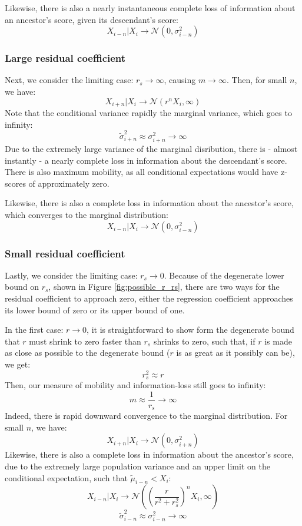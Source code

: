\documentclass[a4paper,11pt]{article} %
\begin{document}
Likewise, there is also a nearly instantaneous complete loss of information about an ancestor's score, given its descendant's score:
$$X_{i-n}|X_i \rightarrow \mathcal{N}(0, \sigma_{i-n}^2)$$


\subsubsection*{Large residual coefficient}
Next, we consider the limiting case: $r_s \rightarrow \infty$, causing $m \rightarrow \infty$. Then, for small $n$, we have:
$$X_{i+n}|X_i \rightarrow \mathcal{N}(r^nX_i, \infty)$$
Note that the conditional variance rapidly the marginal variance, which goes to infinity:
$$ \tilde{\sigma}_{i+n}^2 \approx \sigma_{i+n}^2 \rightarrow \infty$$
Due to the extremely large variance of the marginal disribution, there is - almost instantly - a nearly complete loss in information about the descendant's score. There is also maximum mobility, as all conditional expectations would have z-scores of approximately zero. 

Likewise, there is also a complete loss in information about the ancestor's score, which converges to the marginal distribution:
$$X_{i-n}|X_i \rightarrow \mathcal{N}(0, \sigma_{i-n}^2)$$


\subsubsection*{Small residual coefficient}
Lastly, we consider the limiting case: $r_s \rightarrow 0$. Because of the degenerate lower bound on $r_s$, shown in Figure \ref{fig:possible_r_rs}, there are two ways for the residual coefficient to approach zero, either the regression coefficient approaches its lower bound of zero or its upper bound of one.

In the first case: $r \rightarrow 0$, it is straightforward to show form the degenerate bound that $r$ must shrink to zero faster than $r_s$ shrinks to zero, such that, if $r$ is made as close as possible to the degenerate bound ($r$ is as great as it possibly can be), we get:
$$r_s^2 \approx r$$
Then, our measure of mobility and information-loss still goes to infinity:
$$m \approx \frac{1}{r_s} \rightarrow \infty$$
Indeed, there is rapid downward convergence to the marginal distribution. For small $n$, we have:
$$X_{i+n}|X_i \rightarrow \mathcal{N}(0, \sigma_{i+n}^2)$$
Likewise, there is also a complete loss in information about the ancestor's score, due to the extremely large population variance and an upper limit on the conditional expectation, such that $\tilde{\mu}_{i-n} < X_i$:
$$X_{i-n}|X_i \rightarrow \mathcal{N}((\frac{r}{r^2+r_s^2})^n X_i, \infty)$$
$$\tilde{\sigma}_{i-n}^2 \approx \sigma_{i-n}^2 \rightarrow \infty$$
\end{document}
